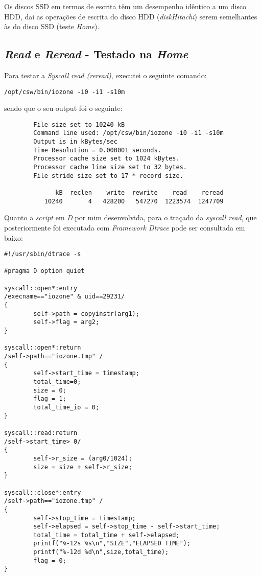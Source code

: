 \documentclass[conference,compsoc]{IEEEtran}
\begin{document}
Os discos SSD em termos de escrita têm um desempenho idêntico a um disco HDD, dai as operações de escrita do disco HDD (\textit{diskHitachi}) serem semelhantes às do disco SSD (teste \textit{Home}).



\subsection{\textit{Read} e \textit{Reread} - Testado na \textit{Home}}

Para testar a \textit{Syscall read (reread)}, executei o seguinte comando:

\begin{lstlisting}
/opt/csw/bin/iozone -i0 -i1 -s10m
\end{lstlisting}

sendo que o seu output foi o seguinte:

\begin{lstlisting}
        File size set to 10240 kB
        Command line used: /opt/csw/bin/iozone -i0 -i1 -s10m
        Output is in kBytes/sec
        Time Resolution = 0.000001 seconds.
        Processor cache size set to 1024 kBytes.
        Processor cache line size set to 32 bytes.
        File stride size set to 17 * record size.
                                                                                                  
              kB  reclen    write  rewrite    read    reread    
           10240       4   428200   547270  1223574  1247709 
\end{lstlisting}

Quanto a \textit{script} em \textit{D} por mim desenvolvida, para o traçado da \textit{syscall read}, que posteriormente foi executada com \textit{Framework Dtrace} pode ser consultada em baixo:

\begin{lstlisting}
#!/usr/sbin/dtrace -s

#pragma D option quiet

syscall::open*:entry
/execname=="iozone" & uid==29231/
{
        self->path = copyinstr(arg1);
        self->flag = arg2;
}

syscall::open*:return
/self->path=="iozone.tmp" /
{
        self->start_time = timestamp;
        total_time=0;
        size = 0;
        flag = 1;
        total_time_io = 0;
}

syscall::read:return
/self->start_time> 0/
{
        self->r_size = (arg0/1024);     
        size = size + self->r_size;
}

syscall::close*:entry
/self->path=="iozone.tmp" /
{
        self->stop_time = timestamp;
        self->elapsed = self->stop_time - self->start_time;
        total_time = total_time + self->elapsed; 
        printf("%-12s %s\n","SIZE","ELAPSED TIME");
        printf("%-12d %d\n",size,total_time);
        flag = 0;
}
\end{lstlisting}
\end{document}
